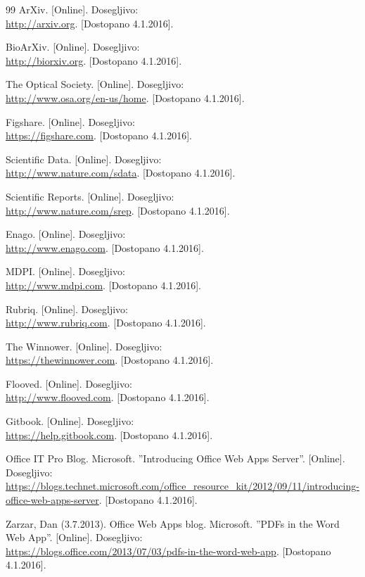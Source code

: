 \documentclass[a4paper, 12pt]{book}
\begin{document}
\begin{thebibliography}{99}
ArXiv.
[Online]. Dosegljivo:\\
\url{http://arxiv.org}.
[Dostopano 4.1.2016].

BioArXiv.
[Online]. Dosegljivo:\\
\url{http://biorxiv.org}.
[Dostopano 4.1.2016].

The Optical Society.
[Online]. Dosegljivo:\\
\url{http://www.osa.org/en-us/home}.
[Dostopano 4.1.2016].

Figshare.
[Online]. Dosegljivo:\\
\url{https://figshare.com}.
[Dostopano 4.1.2016].


Scientific Data.
[Online]. Dosegljivo:\\
\url{http://www.nature.com/sdata}.
[Dostopano 4.1.2016].

Scientific Reports.
[Online]. Dosegljivo:\\
\url{http://www.nature.com/srep}.
[Dostopano 4.1.2016].

Enago.
[Online]. Dosegljivo:\\
\url{http://www.enago.com}.
[Dostopano 4.1.2016].

MDPI.
[Online]. Dosegljivo:\\
\url{http://www.mdpi.com}.
[Dostopano 4.1.2016].

Rubriq.
[Online]. Dosegljivo:\\
\url{http://www.rubriq.com}.
[Dostopano 4.1.2016].

The Winnower.
[Online]. Dosegljivo:\\
\url{https://thewinnower.com}.
[Dostopano 4.1.2016].

Flooved.
[Online]. Dosegljivo:\\
\url{http://www.flooved.com}.
[Dostopano 4.1.2016].

Gitbook.
[Online]. Dosegljivo:\\
\url{https://help.gitbook.com}.
[Dostopano 4.1.2016].

Office IT Pro Blog. Microsoft. ''Introducing Office Web Apps Server''. 
[Online]. Dosegljivo:\\
\url{https://blogs.technet.microsoft.com/office\_resource\_kit/2012/09/11/introducing-office-web-apps-server}.
[Dostopano 4.1.2016].

Zarzar, Dan (3.7.2013). Office Web Apps blog. Microsoft. ''PDFs in the Word Web App''. 
[Online]. Dosegljivo:\\
\url{https://blogs.office.com/2013/07/03/pdfs-in-the-word-web-app}.
[Dostopano 4.1.2016].


\end{thebibliography}
\end{document}
